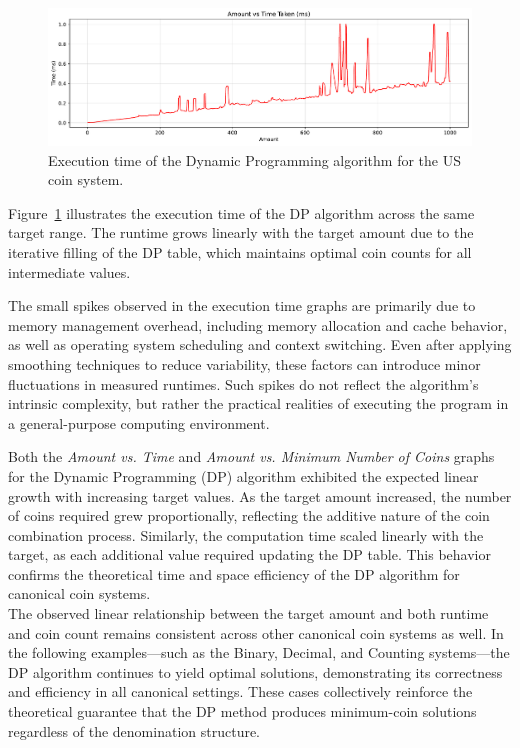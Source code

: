 \documentclass[12pt,a4paper]{report}
\begin{document}
\begin{figure}[H]
  \centering
  \includegraphics[width=\textwidth]{graphs/dp_time_standard_plot.pdf}
  \caption{Execution time of the Dynamic Programming algorithm for the US coin system.}
  \label{fig:dp_time_standard_plot}
\end{figure}

Figure~\ref{fig:dp_time_standard_plot} illustrates the execution time of the DP algorithm across the same target range. The runtime grows linearly with the target amount due to the iterative filling of the DP table, which maintains optimal coin counts for all intermediate values.

\begin{tcolorbox}[colback=gray!5!white, colframe=black, title=Note for the spikes in many runtime graph]
The small spikes observed in the execution time graphs are primarily due to memory management overhead, including memory allocation and cache behavior, as well as operating system scheduling and context switching. Even after applying smoothing techniques to reduce variability, these factors can introduce minor fluctuations in measured runtimes. Such spikes do not reflect the algorithm's intrinsic complexity, but rather the practical realities of executing the program in a general-purpose computing environment.
\end{tcolorbox}

Both the \textit{Amount vs. Time} and \textit{Amount vs. Minimum Number of Coins} graphs for the Dynamic Programming (DP) algorithm exhibited the expected linear growth with increasing target values. As the target amount increased, the number of coins required grew proportionally, reflecting the additive nature of the coin combination process. Similarly, the computation time scaled linearly with the target, as each additional value required updating the DP table. This behavior confirms the theoretical time and space efficiency of the DP algorithm for canonical coin systems.\\

The observed linear relationship between the target amount and both runtime and coin count remains consistent across other canonical coin systems as well. In the following examples—such as the Binary, Decimal, and Counting systems—the DP algorithm continues to yield optimal solutions, demonstrating its correctness and efficiency in all canonical settings. These cases collectively reinforce the theoretical guarantee that the DP method produces minimum-coin solutions regardless of the denomination structure.\\
\end{document}
